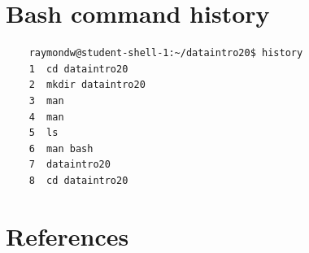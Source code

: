 \documentclass[12pt]{article}
\begin{document}
\section{Bash command history}
\begin{lstlisting}
	raymondw@student-shell-1:~/dataintro20$ history
	1  cd dataintro20
	2  mkdir dataintro20
	3  man
	4  man
	5  ls
	6  man bash
	7  dataintro20
	8  cd dataintro20
\end{lstlisting}

\vspace{0.2cm}
\section{References}
\printbibliography[heading=none]
\end{document}

